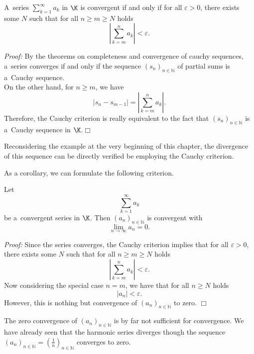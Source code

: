  

\begin{Theorem}
A~series $\displaystyle\sum_{k=1}^\infty a_k$ in $\K$ is convergent if and only if for all $\varepsilon>0$, there exists some $N$ such that for all $n\geq m\geq N$ holds
\[\left|\sum_{k=m}^n a_k\right|<\varepsilon.\]
\end{Theorem}

{\em Proof:} By the theorems on completeness and convergence of cauchy sequences, a~series converges if and only if the sequence $(s_{n})_{n\in\mathbb{N}}$ of partial sums is a~Cauchy sequence.\\
On the other hand, for $n\geq m$, we have
\[\left|s_n-s_{m-1}\right|=\left|\sum_{k=m}^n a_k\right|.\]
Therefore, the Cauchy criterion is really equivalent to the fact that $(s_{n})_{n\in\mathbb{N}}$ is a~Cauchy sequence in $\K$.\hfill$\Box$

\begin{Remark}{}
Reconsidering the example at the very beginning of this chapter, the divergence of this sequence can be directly verified be employing the Cauchy criterion.
\end{Remark}
As a corollary, we can formulate the following criterion.

\begin{Theorem}
\label{eq:conv0}
Let \[\sum_{k=1}^\infty a_k\] be a~convergent series in $\K$. Then $(a_n)_{n \in \mathbb{N}}$ is convergent with
\[\lim_{n\to\infty}a_n=0.\]
\end{Theorem}
{\em Proof:}
Since the series converges, the Cauchy criterion implies that for all $\varepsilon>0$, there exists some $N$ such that for all $n\geq m\geq N$ holds
\[\left|\sum_{k=m}^n a_k\right|<\varepsilon.\]
Now considering the special case $n=m$, we have that for all $n\geq N$ holds
\[|a_n|<\varepsilon.\]
However, this is nothing but convergence of $(a_n)_{n\in\mathbb{N}}$ to zero.
\hfill$\Box$
\begin{Remark}{}
The zero convergence of $(a_n)_{n\in\mathbb{N}}$ is by far not sufficient for convergence. We have already seen that the harmonic series diverges though the sequence $(a_n)_{n\in\mathbb{N}}=(\frac1n)_{n\in\mathbb{N}}$ converges to zero.
\end{Remark}

